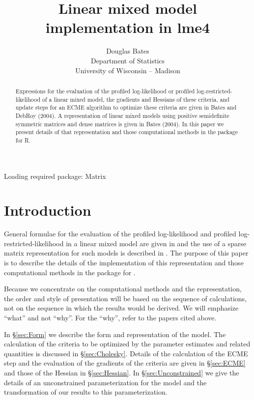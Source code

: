 \documentclass[12pt]{article}
\begin{document}
\title{Linear mixed model implementation in lme4}
\author{Douglas Bates\\Department of Statistics\\University of
  Wisconsin -- Madison\\}
\maketitle
\begin{abstract}
  Expressions for the evaluation of the profiled log-likelihood or
  profiled log-restricted-likelihood of a linear mixed model, the
  gradients and Hessians of these criteria, and update steps for an
  ECME algorithm to optimize these criteria are given in Bates and
  DebRoy (2004).  A representation of linear mixed models using
  positive semidefinite symmetric matrices and dense matrices is given
  in Bates (2004).  In this paper we present details of that
  representation and those computational methods in the 
  package for R.
\end{abstract}

\begin{Schunk}
\begin{Soutput}
Loading required package: Matrix 
\end{Soutput}
\end{Schunk}
\section{Introduction}
\label{sec:Intro}

General formulae for the evaluation of the profiled log-likelihood and
profiled log-restricted-likelihood in a linear mixed model are given
in \citet{bate:debr:2004} and the use of a sparse matrix
representation for such models is described in \citet{bate:2004}.  The
purpose of this paper is to describe the details of the implementation
of this representation and those computational methods in the 
package for \RR{}.

Because we concentrate on the computational methods and the
representation, the order and style of presentation will be based on
the sequence of calculations, not on the sequence in which the results
would be derived.  We will emphasize ``what'' and not ``why''.  For
the ``why'', refer to the papers cited above.

In \S\ref{sec:Form} we describe the form and representation of the
model.  The calculation of the criteria to be optimized by the
parameter estimates and related quantities is discussed in
\S\ref{sec:Cholesky}.  Details of the calculation of the ECME step and the
evaluation of the gradients of the criteria are given in
\S\ref{sec:ECME} and those of the Hessian in \S\ref{sec:Hessian}.  In
\S\ref{sec:Unconstrained} we give the details of an unconstrained
parameterization for the model and the transformation of our
results to this parameterization.
\end{document}
